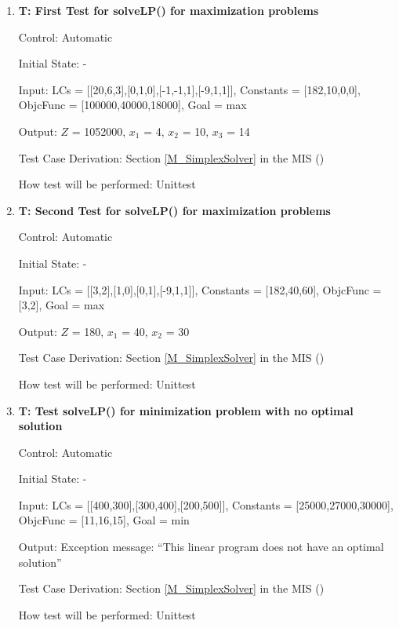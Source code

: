 \documentclass[12pt, titlepage]{article}
\newcounter{testnum} %
\begin{document}
\begin{enumerate}
	
	\item{\textbf{T\thetestnum \label{solveLpMax1}: 
	First Test for solveLP() for maximization problems}}

	Control: Automatic
	
	Initial State: -
	
	Input: LCs = [[20,6,3],[0,1,0],[-1,-1,1],[-9,1,1]], Constants = 
	[182,10,0,0], ObjcFunc = [100000,40000,18000], Goal = max
	
	Output: $Z$ = 1052000, $x_1$ = 4, $x_2$ = 10, $x_3$ = 14
	 	
	Test Case Derivation: Section \ref{M_SimplexSolver} in the MIS 
	(\cite{losms-mis})
	
	How test will be performed: Unittest

	\item{\textbf{T\thetestnum \label{solveLpMax2}: 
			Second Test for solveLP() for maximization problems}}
	
	Control: Automatic
	
	Initial State: -
	
	Input: LCs = [[3,2],[1,0],[0,1],[-9,1,1]], Constants = [182,40,60], 
	ObjcFunc = [3,2], Goal = max
	
	Output: $Z$ = 180, $x_1$ = 40, $x_2$ = 30
	
	Test Case Derivation: Section \ref{M_SimplexSolver} in the MIS 
	(\cite{losms-mis})
	
	How test will be performed: Unittest
	
	\item{\textbf{T\thetestnum \label{solveLpMin}: Test 
	solveLP() for minimization problem with no optimal solution}}
	
	Control: Automatic
	
	Initial State: -
	
	Input: LCs = [[400,300],[300,400],[200,500]], Constants = 
	[25000,27000,30000], ObjcFunc = [11,16,15], Goal = min
	
	Output: Exception message: ``This linear program does not have an optimal 
	solution''
	
	Test Case Derivation: Section \ref{M_SimplexSolver} in the MIS 
	(\cite{losms-mis})
	
	How test will be performed: Unittest
\end{enumerate}

\end{document}
